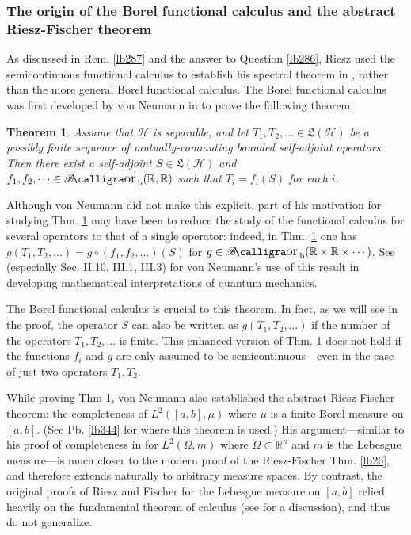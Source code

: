 \documentclass[12pt,b5paper,notitlepage]{article}
\theoremstyle{definition}
\theoremstyle{plain}
\newtheorem{thm}[df]{Theorem}
\DeclareMathOperator{\Borb}{{\mathscr{B}\text{\kern -2pt {\calligra\large or}}\,}_{\mathrm b}}
\newcommand{\fk}{\mathfrak}
\newcommand{\Rbb}{\mathbb R}
\newcommand{\MH}{\mathcal H}
\numberwithin{equation}{section}
\begin{document}
\subsubsection{The origin of the Borel functional calculus and the abstract Riesz-Fischer theorem}\label{lb345}

As discussed in Rem. \ref{lb287} and the answer to Question \ref{lb286}, Riesz used the semicontinuous functional calculus to establish his spectral theorem in \cite{Rie13}, rather than the more general Borel functional calculus. The Borel functional calculus was first developed by von Neumann in \cite{vN31} to prove the following theorem.

\begin{thm}\label{lb343}
Assume that $\MH$ is separable, and let $T_1,T_2,\dots\in\fk L(\MH)$ be a possibly finite sequence of mutually-commuting bounded self-adjoint operators. Then there exist a self-adjoint $S\in\fk L(\MH)$ and $f_1,f_2,\dots\in\Borb(\Rbb,\Rbb)$ such that $T_i=f_i(S)$ for each $i$.
\end{thm}

Although von Neumann did not make this explicit, part of his motivation for studying Thm. \ref{lb343} may have been to reduce the study of the functional calculus for several operators to that of a single operator: indeed, in Thm. \ref{lb343} one has $g(T_1,T_2,\dots)=g\circ (f_1,f_2,\dots)(S)$ for $g\in\Borb(\Rbb\times\Rbb\times\cdots)$. See \cite{vN32a} (especially Sec. II.10, III.1, III.3) for von Neumann's use of this result in developing mathematical interpretations of quantum mechanics.

The Borel functional calculus is crucial to this theorem. In fact, as we will see in the proof, the operator $S$ can also be written as $g(T_1,T_2,\dots)$ if the number of the operators $T_1,T_2,\dots$ is finite. This enhanced version of Thm. \ref{lb343} does not hold if the functions $f_i$ and $g$ are only assumed to be semicontinuous---even in the case of just two operators $T_1,T_2$. 

While proving Thm \ref{lb343}, von Neumann also established the abstract Riesz-Fischer theorem: the completeness of $L^2([a,b],\mu)$ where $\mu$ is a finite Borel measure on $[a,b]$. (See Pb. \ref{lb344} for where this theorem is used.) His argument---similar to his proof of completeness in \cite[Anhang 2]{vN27} for $L^2(\Omega,m)$ where $\Omega\subset\Rbb^n$ and $m$ is the Lebesgue measure---is much closer to the modern proof of the Riesz-Fischer Thm. \ref{lb26}, and therefore extends naturally to arbitrary measure spaces. By contrast, the original proofs of Riesz and Fischer for the Lebesgue measure on $[a,b]$ relied heavily on the fundamental theorem of calculus (see \cite[Sec. 27.3]{Gui-A} for a discussion), and thus do not generalize.
\end{document}
